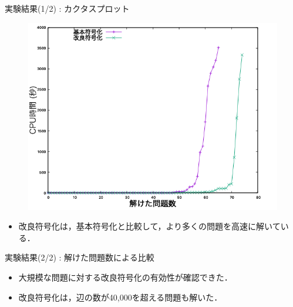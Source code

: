 \documentclass[dvipdfmx,11pt]{beamer}
\begin{document}
\begin{frame}{実験結果(1/2) : カクタスプロット}
 \begin{figure}[h]
  \centering
  \includegraphics[scale=0.38]{fig/cactus.png}
 \end{figure}

\begin{itemize}
 \item 改良符号化は，基本符号化と比較して，より多くの問題を高速に解いている．
\end{itemize}
\end{frame}

\begin{frame}{実験結果(2/2) : 解けた問題数による比較}

\begin{table}[t]
 \centering
 
\end{table}

\begin{itemize}
 \item 大規模な問題に対する改良符号化の有効性が確認できた．
 \item 改良符号化は，辺の数が40,000を超える問題も解いた．
\end{itemize}

\end{frame}
\end{document}
